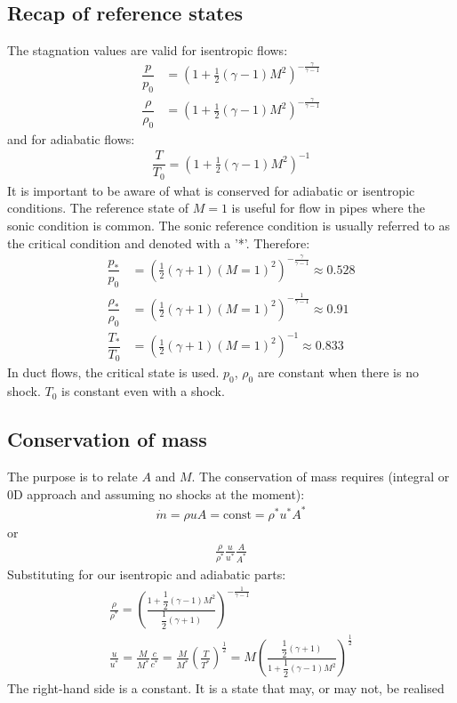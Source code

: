 \documentclass[class=report, crop=false, 12pt,a4paper]{standalone}
\begin{document}
\subsection{Recap of reference states}
The stagnation values are valid for isentropic flows:
\begin{align}
    \dfrac{p}{p_0}       & = \left(1 + \frac{1}{2}\left(\gamma - 1\right)M^2\right)^{-\frac{\gamma}{\gamma - 1}} \\
    \dfrac{\rho}{\rho_0} & = \left(1 + \frac{1}{2}\left(\gamma - 1\right)M^2\right)^{-\frac{\gamma}{\gamma - 1}}
\end{align}
and for adiabatic flows:
\begin{gather}
    \dfrac{T}{T_0} = \left(1 + \frac{1}{2}\left(\gamma - 1\right)M^2\right)^{-1}
\end{gather}
It is important to be aware of what is conserved for adiabatic or isentropic conditions. The reference state of $M = 1$ is useful for flow in pipes where the sonic condition is common. The sonic reference condition is usually referred to as the critical condition and denoted with a '*'. Therefore:
\begin{align}
    \dfrac{p_*}{p_0}       & = \left(\frac{1}{2}\left(\gamma + 1\right)(M=1)^2\right)^{-\frac{\gamma}{\gamma - 1}} \approx 0.528 \\
    \dfrac{\rho_*}{\rho_0} & = \left(\frac{1}{2}\left(\gamma + 1\right)(M=1)^2\right)^{-\frac{1}{\gamma - 1}}  \approx 0.91 \\
    \dfrac{T_*}{T_0}       & = \left(\frac{1}{2}\left(\gamma + 1\right)(M=1)^2\right)^{-1} \approx 0.833
\end{align}
In duct flows, the critical state is used. $p_0$, $\rho_0$ are constant when there is no shock. $T_0$ is constant even with a shock.
\subsection{Conservation of mass}
The purpose is to relate $A$ and $M$. The conservation of mass requires (integral or 0D approach and assuming no shocks at the moment):
\begin{gather}
    \dot{m} = \rho u A = \textrm{const} = \rho^* u^* A^*
\end{gather}
or
\begin{gather}
    \frac{\rho}{\rho^*} \frac{u}{u^*} \frac{A}{A^*}
\end{gather}
Substituting for our isentropic and adiabatic parts:
\begin{gather}
    \frac{\rho}{\rho^*} = \left(\frac{1 + \dfrac{1}{2}\left(\gamma - 1\right)M^2}{\dfrac{1}{2}\left(\gamma + 1 \right)}\right)^{-\frac{1}{\gamma - 1}}\\
    \frac{u}{u^*} = \frac{M}{M^*} \frac{c}{c^*} = \frac{M}{M^*}\left(\frac{T}{T^*}\right)^{\frac{1}{2}} = M \left(\frac{\dfrac{1}{2}\left(\gamma + 1\right)}{1 + \dfrac{1}{2}\left(\gamma - 1\right)M^2}\right)^{\frac{1}{2}}
\end{gather}
The right-hand side is a constant. It is a state that may, or may not, be realised
\end{document}
